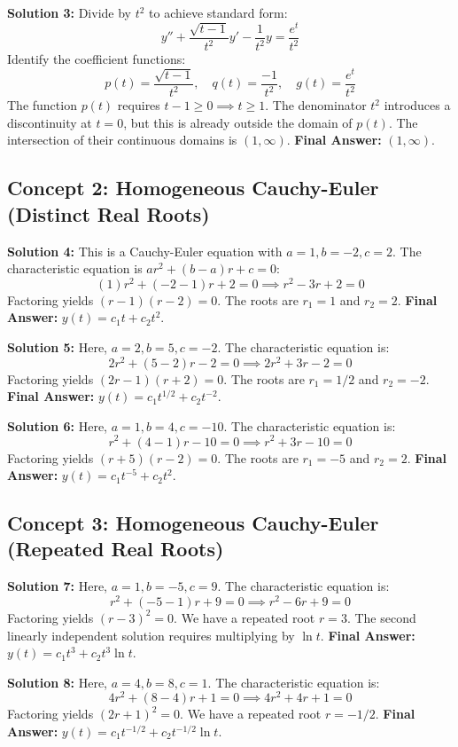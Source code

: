\documentclass[11pt]{article}
\begin{document}
\textbf{Solution 3:}
Divide by $t^2$ to achieve standard form:
\[ y'' + \frac{\sqrt{t - 1}}{t^2}y' - \frac{1}{t^2}y = \frac{e^t}{t^2} \]
Identify the coefficient functions:
\[ p(t) = \frac{\sqrt{t - 1}}{t^2}, \quad q(t) = \frac{-1}{t^2}, \quad g(t) = \frac{e^t}{t^2} \]
The function $p(t)$ requires $t - 1 \ge 0 \implies t \ge 1$. The denominator $t^2$ introduces a discontinuity at $t = 0$, but this is already outside the domain of $p(t)$. The intersection of their continuous domains is $(1, \infty)$.
\textbf{Final Answer:} $(1, \infty)$.

\subsection*{Concept 2: Homogeneous Cauchy-Euler (Distinct Real Roots)}

\textbf{Solution 4:}
This is a Cauchy-Euler equation with $a=1, b=-2, c=2$. The characteristic equation is $ar^2 + (b-a)r + c = 0$:
\[ (1)r^2 + (-2 - 1)r + 2 = 0 \implies r^2 - 3r + 2 = 0 \]
Factoring yields $(r - 1)(r - 2) = 0$. The roots are $r_1 = 1$ and $r_2 = 2$.
\textbf{Final Answer:} $y(t) = c_1 t + c_2 t^2$.

\textbf{Solution 5:}
Here, $a=2, b=5, c=-2$. The characteristic equation is:
\[ 2r^2 + (5 - 2)r - 2 = 0 \implies 2r^2 + 3r - 2 = 0 \]
Factoring yields $(2r - 1)(r + 2) = 0$. The roots are $r_1 = 1/2$ and $r_2 = -2$.
\textbf{Final Answer:} $y(t) = c_1 t^{1/2} + c_2 t^{-2}$.

\textbf{Solution 6:}
Here, $a=1, b=4, c=-10$. The characteristic equation is:
\[ r^2 + (4 - 1)r - 10 = 0 \implies r^2 + 3r - 10 = 0 \]
Factoring yields $(r + 5)(r - 2) = 0$. The roots are $r_1 = -5$ and $r_2 = 2$.
\textbf{Final Answer:} $y(t) = c_1 t^{-5} + c_2 t^2$.

\subsection*{Concept 3: Homogeneous Cauchy-Euler (Repeated Real Roots)}

\textbf{Solution 7:}
Here, $a=1, b=-5, c=9$. The characteristic equation is:
\[ r^2 + (-5 - 1)r + 9 = 0 \implies r^2 - 6r + 9 = 0 \]
Factoring yields $(r - 3)^2 = 0$. We have a repeated root $r = 3$. The second linearly independent solution requires multiplying by $\ln t$.
\textbf{Final Answer:} $y(t) = c_1 t^3 + c_2 t^3 \ln t$.

\textbf{Solution 8:}
Here, $a=4, b=8, c=1$. The characteristic equation is:
\[ 4r^2 + (8 - 4)r + 1 = 0 \implies 4r^2 + 4r + 1 = 0 \]
Factoring yields $(2r + 1)^2 = 0$. We have a repeated root $r = -1/2$.
\textbf{Final Answer:} $y(t) = c_1 t^{-1/2} + c_2 t^{-1/2} \ln t$.
\end{document}
